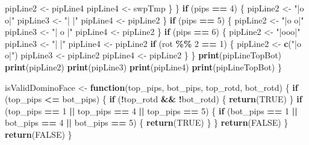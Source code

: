 \documentclass[
]{article}
\newenvironment{Shaded}{\begin{snugshade}}{\end{snugshade}}
\newcommand{\ConstantTok}[1]{\textcolor[rgb]{0.56,0.35,0.01}{#1}}
\newcommand{\ControlFlowTok}[1]{\textcolor[rgb]{0.13,0.29,0.53}{\textbf{#1}}}
\newcommand{\DecValTok}[1]{\textcolor[rgb]{0.00,0.00,0.81}{#1}}
\newcommand{\FunctionTok}[1]{\textcolor[rgb]{0.13,0.29,0.53}{\textbf{#1}}}
\newcommand{\NormalTok}[1]{#1}
\newcommand{\OtherTok}[1]{\textcolor[rgb]{0.56,0.35,0.01}{#1}}
\newcommand{\SpecialCharTok}[1]{\textcolor[rgb]{0.81,0.36,0.00}{\textbf{#1}}}
\newcommand{\StringTok}[1]{\textcolor[rgb]{0.31,0.60,0.02}{#1}}
\begin{document}
\begin{Shaded}
\begin{Highlighting}[]
\NormalTok{        pipLine2 }\OtherTok{\textless{}{-}}\NormalTok{ pipLine4 }
\NormalTok{        pipLine4 }\OtherTok{\textless{}{-}}\NormalTok{ swpTmp}
\NormalTok{      \}}
\NormalTok{    \}}
    \ControlFlowTok{if}\NormalTok{ (pips }\SpecialCharTok{==} \DecValTok{4}\NormalTok{) \{}
\NormalTok{      pipLine2 }\OtherTok{\textless{}{-}} \StringTok{"|o o|"}
\NormalTok{      pipLine3 }\OtherTok{\textless{}{-}} \StringTok{"|   |"}
\NormalTok{      pipLine4 }\OtherTok{\textless{}{-}}\NormalTok{ pipLine2}
\NormalTok{    \}}
    \ControlFlowTok{if}\NormalTok{ (pips }\SpecialCharTok{==} \DecValTok{5}\NormalTok{) \{}
\NormalTok{      pipLine2 }\OtherTok{\textless{}{-}} \StringTok{"|o o|"}
\NormalTok{      pipLine3 }\OtherTok{\textless{}{-}} \StringTok{"| o |"}
\NormalTok{      pipLine4 }\OtherTok{\textless{}{-}}\NormalTok{ pipLine2}
\NormalTok{    \}}
    \ControlFlowTok{if}\NormalTok{ (pips }\SpecialCharTok{==} \DecValTok{6}\NormalTok{) \{}
\NormalTok{      pipLine2 }\OtherTok{\textless{}{-}} \StringTok{"|ooo|"}
\NormalTok{      pipLine3 }\OtherTok{\textless{}{-}} \StringTok{"|   |"}
\NormalTok{      pipLine4 }\OtherTok{\textless{}{-}}\NormalTok{ pipLine2}
      \ControlFlowTok{if}\NormalTok{ (rot }\SpecialCharTok{\%\%} \DecValTok{2} \SpecialCharTok{==} \DecValTok{1}\NormalTok{) \{}
\NormalTok{        pipLine2 }\OtherTok{\textless{}{-}} \FunctionTok{c}\NormalTok{(}\StringTok{"|o o|"}\NormalTok{)}
\NormalTok{        pipLine3 }\OtherTok{\textless{}{-}}\NormalTok{ pipLine2}
\NormalTok{        pipLine4 }\OtherTok{\textless{}{-}}\NormalTok{ pipLine2}
\NormalTok{      \}}
\NormalTok{    \}}
    \FunctionTok{print}\NormalTok{(pipLineTopBot)}
    \FunctionTok{print}\NormalTok{(pipLine2)}
    \FunctionTok{print}\NormalTok{(pipLine3)}
    \FunctionTok{print}\NormalTok{(pipLine4)}
    \FunctionTok{print}\NormalTok{(pipLineTopBot)}
\NormalTok{  \}}


\NormalTok{isValidDominoFace }\OtherTok{\textless{}{-}}
  \ControlFlowTok{function}\NormalTok{(top\_pips, bot\_pips, top\_rotd, bot\_rotd) \{}
    \ControlFlowTok{if}\NormalTok{ (top\_pips }\SpecialCharTok{\textless{}=}\NormalTok{ bot\_pips) \{}
        \ControlFlowTok{if}\NormalTok{ (}\SpecialCharTok{!}\NormalTok{top\_rotd }\SpecialCharTok{\&\&} \SpecialCharTok{!}\NormalTok{bot\_rotd) \{}
           \FunctionTok{return}\NormalTok{(}\ConstantTok{TRUE}\NormalTok{)}
\NormalTok{        \}}
        \ControlFlowTok{if}\NormalTok{ (top\_pips }\SpecialCharTok{==} \DecValTok{1} \SpecialCharTok{||}\NormalTok{ top\_pips }\SpecialCharTok{==} \DecValTok{4} \SpecialCharTok{||}\NormalTok{ top\_pips }\SpecialCharTok{==} \DecValTok{5}\NormalTok{) \{}
          \ControlFlowTok{if}\NormalTok{ (bot\_pips }\SpecialCharTok{==} \DecValTok{1} \SpecialCharTok{||}\NormalTok{ bot\_pips }\SpecialCharTok{==} \DecValTok{4} \SpecialCharTok{||}\NormalTok{ bot\_pips }\SpecialCharTok{==} \DecValTok{5}\NormalTok{) \{}
            \FunctionTok{return}\NormalTok{(}\ConstantTok{TRUE}\NormalTok{)}
\NormalTok{          \}}
\NormalTok{        \}}
        \FunctionTok{return}\NormalTok{(}\ConstantTok{FALSE}\NormalTok{)}
\NormalTok{    \}}
    \FunctionTok{return}\NormalTok{(}\ConstantTok{FALSE}\NormalTok{)}
\NormalTok{  \}}


\end{Highlighting}
\end{Shaded}
\end{document}
